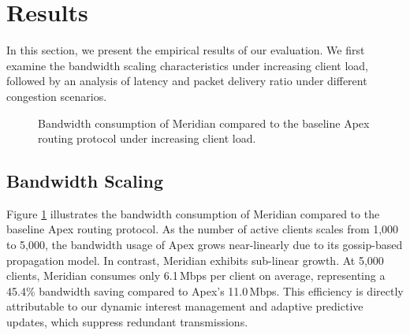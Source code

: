 \section{Results}
In this section, we present the empirical results of our evaluation. We first examine the bandwidth scaling characteristics under increasing client load, followed by an analysis of latency and packet delivery ratio under different congestion scenarios.

\begin{figure}[t]
  \centering
  \caption{Bandwidth consumption of Meridian compared to the baseline Apex routing protocol under increasing client load.}
  \label{fig:bandwidth_scaling}
\end{figure}

\subsection{Bandwidth Scaling}
Figure \ref{fig:bandwidth_scaling} illustrates the bandwidth consumption of Meridian compared to the baseline Apex routing protocol. As the number of active clients scales from 1,000 to 5,000, the bandwidth usage of Apex grows near-linearly due to its gossip-based propagation model. In contrast, Meridian exhibits sub-linear growth. At 5,000 clients, Meridian consumes only 6.1\,Mbps per client on average, representing a 45.4\% bandwidth saving compared to Apex's 11.0\,Mbps. This efficiency is directly attributable to our dynamic interest management and adaptive predictive updates, which suppress redundant transmissions.

